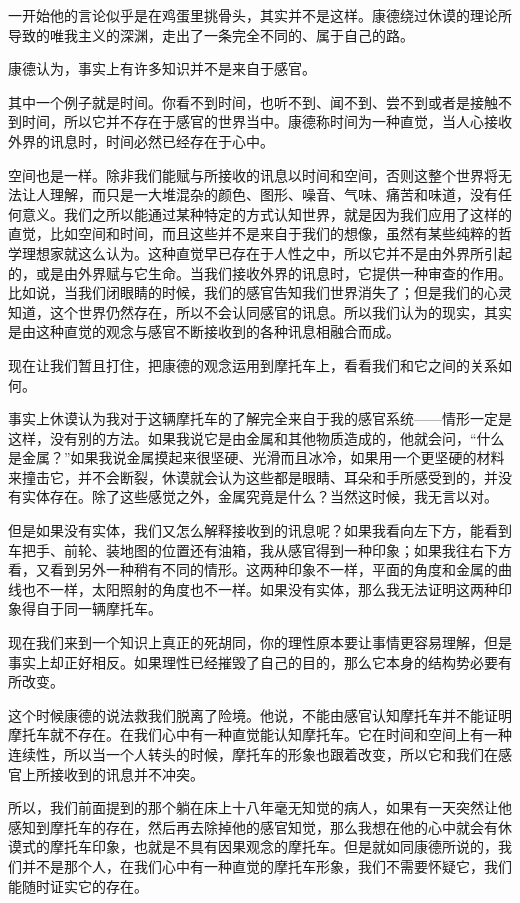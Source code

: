 \documentclass[UTF8]{article}
\begin{document}
\par 一开始他的言论似乎是在鸡蛋里挑骨头，其实并不是这样。康德绕过休谟的理论所导致的唯我主义的深渊，走出了一条完全不同的、属于自己的路。
\par 康德认为，事实上有许多知识并不是来自于感官。
\par 其中一个例子就是时间。你看不到时间，也听不到、闻不到、尝不到或者是接触不到时间，所以它并不存在于感官的世界当中。康德称时间为一种直觉，当人心接收外界的讯息时，时间必然已经存在于心中。
\par 空间也是一样。除非我们能赋与所接收的讯息以时间和空间，否则这整个世界将无法让人理解，而只是一大堆混杂的颜色、图形、噪音、气味、痛苦和味道，没有任何意义。我们之所以能通过某种特定的方式认知世界，就是因为我们应用了这样的直觉，比如空间和时间，而且这些并不是来自于我们的想像，虽然有某些纯粹的哲学理想家就这么认为。这种直觉早已存在于人性之中，所以它并不是由外界所引起的，或是由外界赋与它生命。当我们接收外界的讯息时，它提供一种审查的作用。比如说，当我们闭眼睛的时候，我们的感官告知我们世界消失了；但是我们的心灵知道，这个世界仍然存在，所以不会认同感官的讯息。所以我们认为的现实，其实是由这种直觉的观念与感官不断接收到的各种讯息相融合而成。
\par 现在让我们暂且打住，把康德的观念运用到摩托车上，看看我们和它之间的关系如何。
\par 事实上休谟认为我对于这辆摩托车的了解完全来自于我的感官系统——情形一定是这样，没有别的方法。如果我说它是由金属和其他物质造成的，他就会问，“什么是金属？”如果我说金属摸起来很坚硬、光滑而且冰冷，如果用一个更坚硬的材料来撞击它，并不会断裂，休谟就会认为这些都是眼睛、耳朵和手所感受到的，并没有实体存在。除了这些感觉之外，金属究竟是什么？当然这时候，我无言以对。
\par 但是如果没有实体，我们又怎么解释接收到的讯息呢？如果我看向左下方，能看到车把手、前轮、装地图的位置还有油箱，我从感官得到一种印象；如果我往右下方看，又看到另外一种稍有不同的情形。这两种印象不一样，平面的角度和金属的曲线也不一样，太阳照射的角度也不一样。如果没有实体，那么我无法证明这两种印象得自于同一辆摩托车。
\par 现在我们来到一个知识上真正的死胡同，你的理性原本要让事情更容易理解，但是事实上却正好相反。如果理性已经摧毁了自己的目的，那么它本身的结构势必要有所改变。
\par 这个时候康德的说法救我们脱离了险境。他说，不能由感官认知摩托车并不能证明摩托车就不存在。在我们心中有一种直觉能认知摩托车。它在时间和空间上有一种连续性，所以当一个人转头的时候，摩托车的形象也跟着改变，所以它和我们在感官上所接收到的讯息并不冲突。
\par 所以，我们前面提到的那个躺在床上十八年毫无知觉的病人，如果有一天突然让他感知到摩托车的存在，然后再去除掉他的感官知觉，那么我想在他的心中就会有休谟式的摩托车印象，也就是不具有因果观念的摩托车。但是就如同康德所说的，我们并不是那个人，在我们心中有一种直觉的摩托车形象，我们不需要怀疑它，我们能随时证实它的存在。
\end{document}
